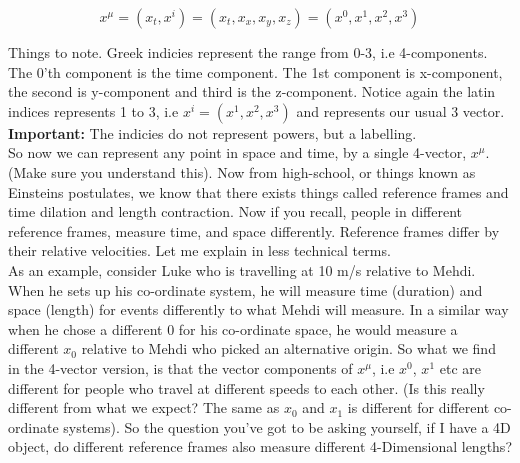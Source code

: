 \begin{equation}
  x^\mu = (x_t, x^i) = (x_t, x_x, x_y, x_z) = (x^0, x^1, x^2, x^3)
\end{equation}

Things to note. Greek indicies represent the range from 0-3, i.e 4-components. The 0'th component is the time component. The 1st component is x-component, the second is y-component and third is the z-component. Notice again the latin indices represents 1 to 3, i.e $x^i = (x^1, x^2, x^3)$ and represents our usual 3 vector. \textbf{Important:} The indicies do not represent powers, but a labelling. \\

So now we can represent any point in space and time, by a single 4-vector, $x^{\mu}$. (Make sure you understand this). Now from high-school, or things known as Einsteins postulates, we know that there exists things called reference frames and time dilation and length contraction. Now if you recall, people in different reference frames, measure time, and space differently. Reference frames differ by their relative velocities. Let me explain in less technical terms. \\

As an example, consider Luke who is travelling at 10 m/s relative to Mehdi. When he sets up his co-ordinate system, he will measure time (duration) and space (length) for events differently to what Mehdi will measure. In a similar way when he chose a different 0 for his co-ordinate space, he would measure a different $x_0$ relative to Mehdi who picked an alternative origin. So what we find in the 4-vector version, is that the vector components of $x^\mu$, i.e $x^0$, $x^1$ etc are different for people who travel at different speeds to each other. (Is this really different from what we expect? The same as $x_0$ and $x_1$ is different for different co-ordinate systems). So the question you've got to be asking yourself, if I have a 4D object, do different reference frames also measure different 4-Dimensional lengths?


